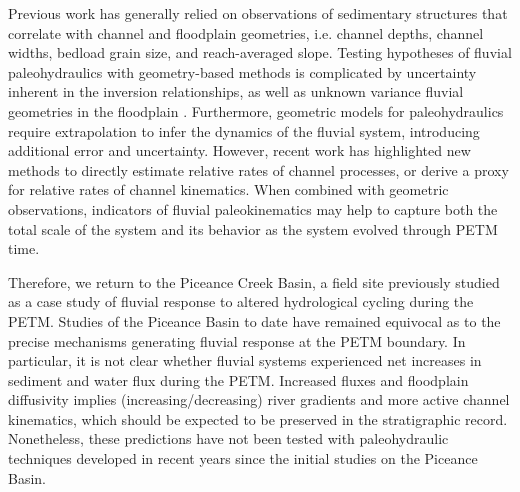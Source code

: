 \documentclass[draft]{compact_proposal}
\begin{document}
Previous work has generally relied on observations of sedimentary structures that correlate with channel and floodplain geometries, i.e. channel depths, channel widths, bedload grain size, and reach-averaged slope.
Testing hypotheses of fluvial paleohydraulics with geometry-based methods is complicated by uncertainty inherent in the inversion relationships, as well as unknown variance fluvial geometries in the floodplain .
Furthermore, geometric models for paleohydraulics require extrapolation to infer the dynamics of the fluvial system, introducing additional error and uncertainty.
However, recent work has highlighted new methods to directly estimate relative rates of channel processes, or derive a proxy for relative rates of channel kinematics.
When combined with geometric observations, indicators of fluvial paleokinematics may help to capture both the total scale of the system and its behavior as the system evolved through PETM time.



Therefore, we return to the Piceance Creek Basin, a field site previously studied as a case study of fluvial response to altered hydrological cycling during the PETM.
Studies of the Piceance Basin to date  have remained equivocal as to the precise mechanisms generating fluvial response at the PETM boundary.
In particular, it is not clear whether fluvial systems experienced net increases in sediment and water flux during the PETM.
Increased fluxes and floodplain diffusivity implies (increasing/decreasing) river gradients and more active channel kinematics, which should be expected to be preserved in the stratigraphic record.
Nonetheless, these predictions have not been tested with paleohydraulic techniques developed in recent years since the initial studies on the Piceance Basin.
\end{document}
